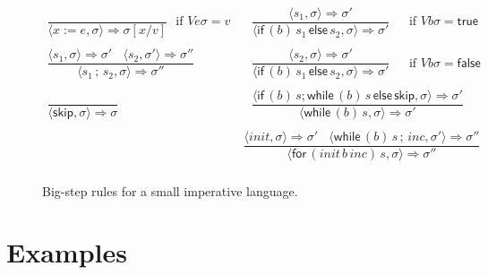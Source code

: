 \documentclass{llncs}
\newcommand{\true}{\mathsf {true}}
\newcommand{\false}{\mathsf {false}}
\newcommand{\keyword}[1]{\mathsf{#1}}
\newcommand{\SKIP}{\keyword{skip}}
\newcommand{\ASG}[2]{#1 := #2}
\newcommand{\SEQ}[2]{#1\,{;}\,#2}
\newcommand{\IFNZ}[3]{\keyword{if} \,(#1)\, #2\,\keyword{else}\,#3}
\newcommand{\FOR}[4]{\keyword{for} \,(#1\,#2\,#3)\, #4}
\newcommand{\WHILE}[2]{\keyword{while} \,(#1)\, #2}
\begin{document}
\begin{figure}
\[
\begin{array}{l|l}
 \dfrac{ } 
{\langle \ASG{x}{e}, \sigma \rangle \Longrightarrow \sigma[x/v]}
 ~~~\text{if } V e \sigma = v~


&~~~
\dfrac{\langle s_1, \sigma \rangle \Longrightarrow \sigma' } 
{\langle \IFNZ{b}{s_1}{s_2}, \sigma \rangle \Longrightarrow \sigma'}
 ~~~~~~~\text{if } V b \sigma = \true\\
 \\
\dfrac{\langle s_1, \sigma \rangle \Longrightarrow \sigma' ~~~~\langle s_2, \sigma' \rangle \Longrightarrow \sigma''} 
{\langle \SEQ{s_1}{s_2}, \sigma \rangle \Longrightarrow \sigma''}~~~
&~~~
\dfrac{\langle s_2, \sigma \rangle \Longrightarrow \sigma' } 
{\langle \IFNZ{b}{s_1}{s_2}, \sigma \rangle \Longrightarrow \sigma'}
 ~~~~~~~\text{if } V b \sigma = \false\\
 \\
 \dfrac{} 
{\langle \SKIP, \sigma \rangle \Longrightarrow \sigma}
 ~
&~~~
\dfrac{\langle \IFNZ{b}{s;\WHILE{b}{s}}{\SKIP}, \sigma \rangle \Longrightarrow \sigma'} 
{\langle \WHILE{b}{s}, \sigma \rangle \Longrightarrow \sigma'}
\\
\\
&
\dfrac{\langle \mathit{init}, \sigma \rangle \Longrightarrow \sigma' ~~~~\langle \WHILE{b}{\SEQ{s}{\mathit{inc}}}, \sigma' \rangle \Longrightarrow \sigma''} 
{\langle \FOR{\mathit{init}}{b}{\mathit{inc}}{s}, \sigma \rangle \Longrightarrow \sigma''}
\\
 \end{array}
\]
\caption{Big-step rules for a small imperative language.}\label{big-step-trans}
\end{figure}

\section{Examples}\label{examples}
\end{document}
